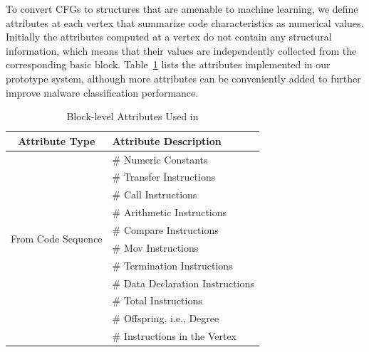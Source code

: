 


To convert CFGs to structures that are amenable to machine learning, we define attributes at each vertex that summarize code characteristics as numerical values.
Initially the attributes computed at a vertex do not contain any structural information, which means that their values are independently collected from the corresponding basic block.
Table~\ref{MG:Tab:UsedAttributes} lists the attributes implemented in our prototype system, although more attributes can be conveniently added to further improve malware classification performance.

\begin{table}[htbp]
    \caption{Block-level Attributes Used in \sysname}
    \begin{center}
        \begin{tabular}{c|l}
            \hline
            Attribute Type & Attribute Description \\
            \hline
            \multirow{10}{*}{From Code Sequence} & \# Numeric Constants \\
            & \# Transfer Instructions         \\
            & \# Call Instructions             \\
            & \# Arithmetic Instructions       \\
            & \# Compare Instructions          \\
            & \# Mov Instructions              \\
            & \# Termination Instructions      \\
            & \# Data Declaration Instructions \\
            & \# Total Instructions            \\
            \hline
            \multirow{2}{*}{From Vertex Structure} & \# Offspring, i.e., Degree \\
            & \# Instructions in the Vertex    \\
            \hline
        \end{tabular}
        \label{MG:Tab:UsedAttributes}
    \end{center}
\end{table}

